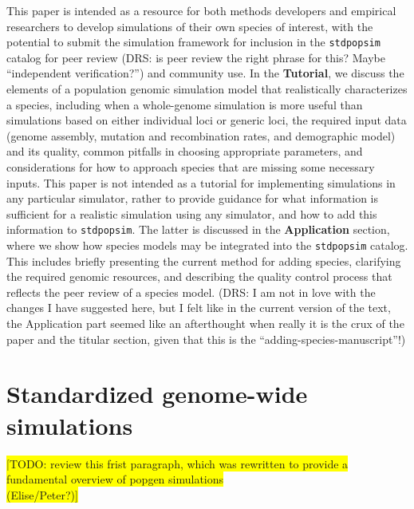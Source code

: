 \documentclass[hidelinks]{article}
\newcommand{\stdpopsim}{\texttt{stdpopsim}\xspace}
\begin{document}
This paper is intended as a resource for both methods
developers and empirical researchers to develop simulations of their own
species of interest, with the potential to submit the simulation
framework for inclusion in the \stdpopsim catalog for peer review
(DRS: is peer review the right phrase for this? Maybe ``independent verification?'') and
community use. In the \textbf{Tutorial}, we discuss the elements of a
population genomic simulation model that realistically characterizes a
species, including when a whole-genome simulation is more useful than
simulations based on either individual loci or generic loci, the required input data (genome
assembly, mutation and recombination rates, and demographic model) and
its quality, common pitfalls in choosing appropriate parameters, and
considerations for how to approach species that are missing some
necessary inputs. This paper is not intended as a tutorial for
implementing simulations in any particular simulator, rather to provide
guidance for what information is sufficient for a realistic simulation
using any simulator, and how to add this information to \stdpopsim. The latter 
is discussed in the \textbf{Application} section, where we show how
species models may be integrated into the \stdpopsim catalog. This includes
briefly presenting the current method for adding species, clarifying the
required genomic resources, and describing the quality control process
that reflects the peer review of a species model.
(DRS: I am not in love with the changes I have suggested here,
but I felt like in the current version of the text, the Application
part seemed like an afterthought when really it is the crux of the paper
and the titular section, given that this is the ``adding-species-manuscript''!)


\hypertarget{sec2}{%
	\section*{Standardized genome-wide simulations}\label{sec:std-sim}}



%

\colorbox{yellow}{[TODO:  review this frist paragraph, which was rewritten to
	provide a fundamental overview of popgen simulations}\\
\colorbox{yellow}{ (Elise/Peter?)]}
	
\end{document}
